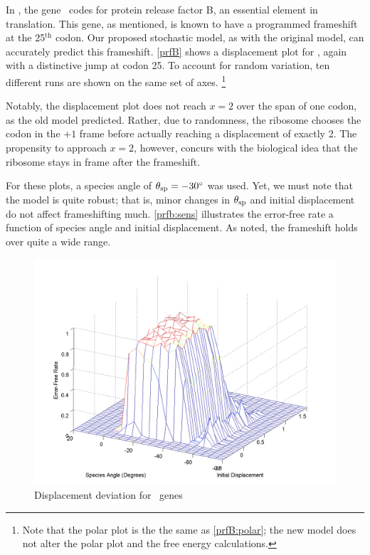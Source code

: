 \documentclass[12pt, draft]{article}
\numberwithin{equation}{section}
\begin{document}
In \ecoli, the gene \prfB\ codes for protein release factor B, an essential element in translation.
This gene, as mentioned, is known to have a programmed frameshift at
the 25$^{\textrm{th}}$ codon.
Our proposed stochastic model, as with the original model, can accurately predict this frameshift.
\autoref{prfB} shows a displacement plot for \prfB, again with a distinctive jump at codon 25.
To account for random variation, ten different runs are shown on the same set of axes.
\footnote{Note that the polar plot is the the same as \autoref{prfB:polar}; 
the new model does not alter the polar plot and the free energy calculations.}

Notably, the displacement plot does not reach $x=2$ over the span of one codon, as the old model predicted.
Rather, due to randomness, the ribosome chooses the codon in the $+1$ frame before actually reaching a displacement of exactly 2.
The propensity to approach $x=2$, however, concurs with the biological idea that the ribosome stays in frame after the frameshift.

For these plots, a species angle of $\theta_{\rm{sp}} =-30^\circ$ was used.
Yet, we must note that the model is quite robust; that is, minor changes
in $\theta_{\rm{sp}}$ and initial displacement do not affect frameshifting much.
\autoref{prfb:sens} illustrates the error-free rate
a function of species angle and initial displacement.  As noted,
the frameshift holds over quite a wide range.

\begin{figure}
  \centering
  \caption{Displacement deviation for \ecoli\ genes}
  \label{prfb:sens}
  \includegraphics[scale=0.2]{prfB/sensitivity}
\end{figure}
\end{document}
